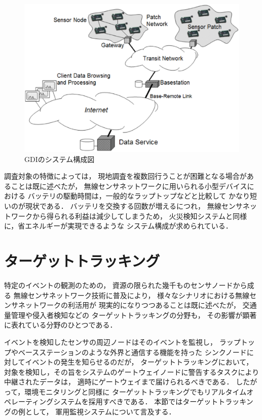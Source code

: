 \begin{figure}[htbp]
 \begin{center}
  \includegraphics[width=120mm]{./images/gdi_system_architecture.eps}
 \end{center}
 \caption{GDIのシステム構成図}
 \label{fig:gdi_system_architecture}
\end{figure}


調査対象の特徴によっては，
現地調査を複数回行うことが困難となる場合があることは既に述べたが，
無線センサネットワークに用いられる小型デバイスにおける
バッテリの駆動時間は，一般的なラップトップなどと比較して
かなり短いのが現状である．
バッテリを交換する回数が増えるにつれ，
無線センサネットワークから得られる利益は減少してしまうため，
火災検知システムと同様に，省エネルギーが実現できるような
システム構成が求められている．




\section{ターゲットトラッキング}\label{sec:target_tracking}
特定のイベントの観測のための，
資源の限られた幾千ものセンサノードから成る
無線センサネットワーク技術に普及により，
様々なシナリオにおける無線センサネットワークの利活用が
現実的になりつつあることは既に述べたが，
交通量管理や侵入者検知などの
ターゲットトラッキングの分野も，
その影響が顕著に表れている分野のひとつである．

イベントを検知したセンサの周辺ノードはそのイベントを監視し，
ラップトップやベースステーションのような外界と通信する機能を持った
シンクノードに対してイベントの発生を知らせるのだが，
ターゲットトラッキングにおいて，
対象を検知し，その旨をシステムのゲートウェイノードに警告するタスクにより
中継されたデータは，
適時にゲートウェイまで届けられるべきである．
したがって，環境モニタリングと同様に
ターゲットトラッキングでもリアルタイムオペレーティングシステムを採用すべきである．
本節ではターゲットトラッキングの例として，
軍用監視システムについて言及する．



